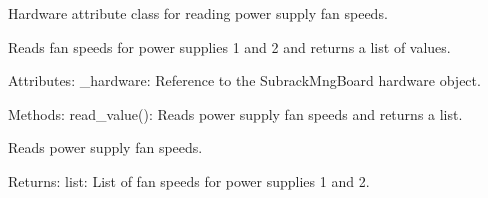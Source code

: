 \documentclass[letterpaper,10pt,english]{sphinxmanual}
\begin{document}
\begin{fulllineitems}
\label{\detokenize{webserverdocs:subrack_hardware.PSFanSpeed}}
\pysigstartsignatures
{}
\pysigstopsignatures
\sphinxAtStartPar
Hardware attribute class for reading power supply fan speeds.

\sphinxAtStartPar
Reads fan speeds for power supplies 1 and 2 and returns a list of values.

\sphinxAtStartPar
Attributes:
\sphinxhyphen{} \_hardware: Reference to the SubrackMngBoard hardware object.

\sphinxAtStartPar
Methods:
\sphinxhyphen{} read\_value(): Reads power supply fan speeds and returns a list.

\begin{fulllineitems}
\label{\detokenize{webserverdocs:subrack_hardware.PSFanSpeed.read_value}}
\pysigstartsignatures
{}
\pysigstopsignatures
\sphinxAtStartPar
Reads power supply fan speeds.

\sphinxAtStartPar
Returns:
list: List of fan speeds for power supplies 1 and 2.

\end{fulllineitems}


\end{fulllineitems}

\end{document}
